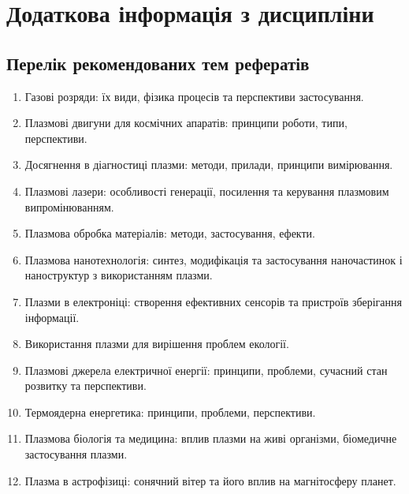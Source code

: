 \documentclass{Syllabus}
\begin{document}

\section{Додаткова інформація з дисципліни}

\subsection*{Перелік рекомендованих тем рефератів}\label{sec:referat}
\begin{enumerate}
\item Газові розряди: їх види, фізика процесів та перспективи застосування.
\item Плазмові двигуни для космічних апаратів: принципи роботи, типи, перспективи.
\item Досягнення в діагностиці плазми: методи, прилади, принципи вимірювання.
\item Плазмові лазери: особливості генерації, посилення та керування плазмовим випромінюванням.
\item Плазмова обробка матеріалів: методи, застосування, ефекти.
\item Плазмова нанотехнологія: синтез, модифікація та застосування наночастинок і наноструктур з використанням плазми.
\item Плазми в електроніці: створення ефективних сенсорів та пристроїв зберігання інформації.
\item Використання плазми для вирішення проблем екології.
\item Плазмові джерела електричної енергії: принципи, проблеми, сучасний стан розвитку та перспективи.
\item Термоядерна енергетика: принципи, проблеми, перспективи.
\item Плазмова біологія та медицина: вплив плазми на живі організми, біомедичне застосування плазми.
\item Плазма в астрофізиці: сонячний вітер та його вплив на магнітосферу планет.
\end{enumerate}











\end{document}
